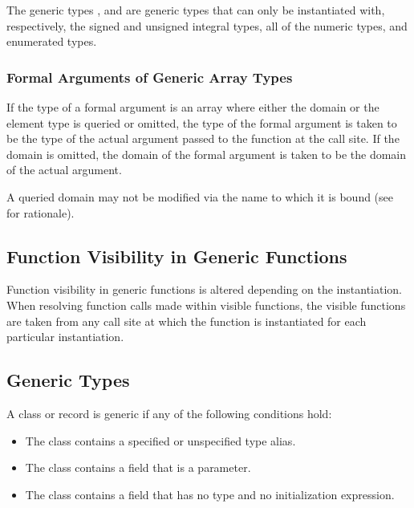 The generic types ,  and 
are generic types that can only be instantiated with, respectively, the
signed and unsigned integral types, all of the numeric types, and
enumerated types.

\subsubsection{Formal Arguments of Generic Array Types}
\label{Formal_Arguments_of_Generic_Array_Types}

If the type of a formal argument is an array where either the domain
or the element type is queried or omitted, the type of the formal
argument is taken to be the type of the actual argument passed to the
function at the call site.  If the domain is omitted, the domain of
the formal argument is taken to be the domain of the actual argument.

A queried domain may not be modified via the name to which it is bound
(see~ for rationale).

\subsection{Function Visibility in Generic Functions}
\label{Function_Visibility_in_Generic_Functions}

Function visibility in generic functions is altered depending on the
instantiation.  When resolving function calls made within visible
functions, the visible functions are taken from any call site at which
the function is instantiated for each particular instantiation.

\subsection{Generic Types}
\label{Generic_Types}

A class or record is generic if any of the following conditions hold:
\begin{itemize}
\item
The class contains a specified or unspecified type alias.
\item
The class contains a field that is a parameter.
\item
The class contains a field that has no type and no initialization
expression.
\end{itemize}


